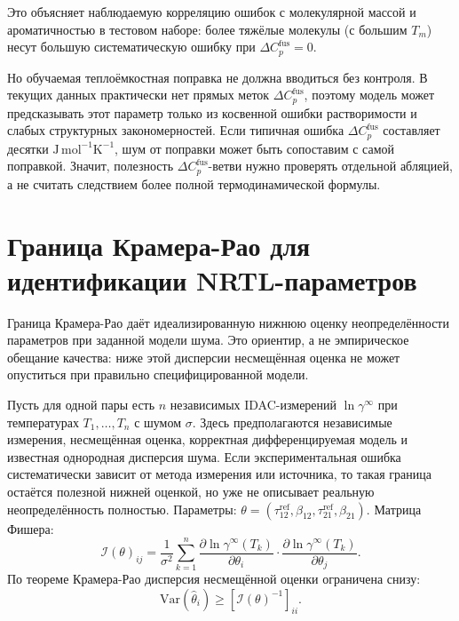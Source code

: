 \documentclass[11pt]{article}
\newcommand{\dCpfus}{\Delta C_p^{\mathrm{fus}}}
\theoremstyle{definition}
\begin{document}
Это объясняет наблюдаемую корреляцию ошибок с молекулярной массой и ароматичностью в тестовом наборе: более тяжёлые молекулы (с большим $T_m$) несут большую систематическую ошибку при $\dCpfus = 0$.

Но обучаемая теплоёмкостная поправка не должна вводиться без контроля. В текущих данных практически нет прямых меток $\dCpfus$, поэтому модель может предсказывать этот параметр только из косвенной ошибки растворимости и слабых структурных закономерностей. Если типичная ошибка $\dCpfus$ составляет десятки $\mathrm{J\,mol^{-1}K^{-1}}$, шум от поправки может быть сопоставим с самой поправкой. Значит, полезность $\dCpfus$-ветви нужно проверять отдельной абляцией, а не считать следствием более полной термодинамической формулы.

\section{Граница Крамера-Рао для идентификации NRTL-параметров}
\label{app:cramer-rao}

Граница Крамера-Рао даёт идеализированную нижнюю оценку неопределённости параметров при заданной модели шума. Это ориентир, а не эмпирическое обещание качества: ниже этой дисперсии несмещённая оценка не может опуститься при правильно специфицированной модели.

Пусть для одной пары есть $n$ независимых IDAC-измерений $\ln\gamma^\infty$ при температурах $T_1, \ldots, T_n$ с шумом $\sigma$. Здесь предполагаются независимые измерения, несмещённая оценка, корректная дифференцируемая модель и известная однородная дисперсия шума. Если экспериментальная ошибка систематически зависит от метода измерения или источника, то такая граница остаётся полезной нижней оценкой, но уже не описывает реальную неопределённость полностью. Параметры: $\theta = (\tau_{12}^{\mathrm{ref}}, \beta_{12}, \tau_{21}^{\mathrm{ref}}, \beta_{21})$. Матрица Фишера:
\begin{equation}
    \mathcal{I}(\theta)_{ij} = \frac{1}{\sigma^2} \sum_{k=1}^n \frac{\partial \ln\gamma^\infty(T_k)}{\partial \theta_i} \cdot \frac{\partial \ln\gamma^\infty(T_k)}{\partial \theta_j}.
\end{equation}
По теореме Крамера-Рао дисперсия несмещённой оценки ограничена снизу:
\begin{equation}
    \mathrm{Var}(\hat{\theta}_i) \ge [\mathcal{I}(\theta)^{-1}]_{ii}.
\end{equation}
\end{document}

